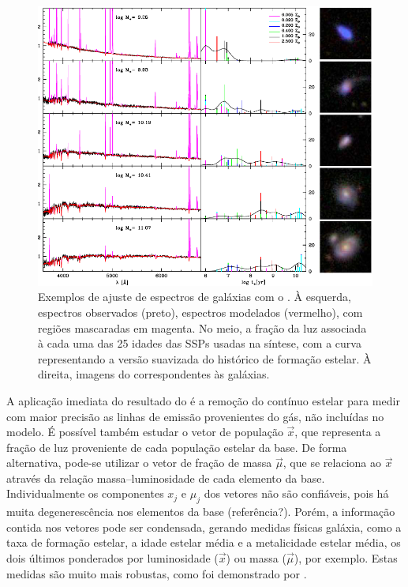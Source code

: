 \begin{figure}
	\includegraphics[width=1.0\textwidth]{figuras/starlight-fit.pdf}
	\caption[Exemplos de ajuste de espectro com o \starlight.]
	{Exemplos de ajuste de espectros de galáxias com o \starlight
	\citep{Asari2007}. À esquerda, espectros observados (preto), espectros
	modelados (vermelho), com regiões mascaradas em magenta. No meio, a fração da
	luz associada à cada uma das 25 idades das SSPs usadas na síntese, com a curva
	representando a versão suavizada do histórico de formação estelar. À direita,
	imagens do \SDSS correspondentes às galáxias.}
	\label{fig:StarlightSpectrumSample}
\end{figure}

A aplicação imediata do resultado do \starlight é a remoção do contínuo estelar
para medir com maior precisão as linhas de emissão provenientes do gás, não
incluídas no modelo. É possível também estudar o vetor de população $\vec{x}$,
que representa a fração de luz proveniente de cada população estelar da base. De
forma alternativa, pode-se utilizar o vetor de fração de massa $\vec{\mu}$, que
se relaciona ao $\vec{x}$ através da relação massa--luminosidade de cada
elemento da base. Individualmente os componentes $x_j$ e $\mu_j$ dos vetores não
são confiáveis, pois há muita degenerescência nos elementos da base\fixme
(referência?). Porém, a informação contida nos vetores pode ser condensada,
gerando medidas físicas galáxia, como a taxa de formação estelar, a idade
estelar média e a metalicidade estelar média, os dois últimos ponderados por
luminosidade ($\vec{x}$) ou massa ($\vec{\mu}$), por exemplo. Estas medidas são
muito mais robustas, como foi demonstrado por \citet{CidFernandes2013b}.


